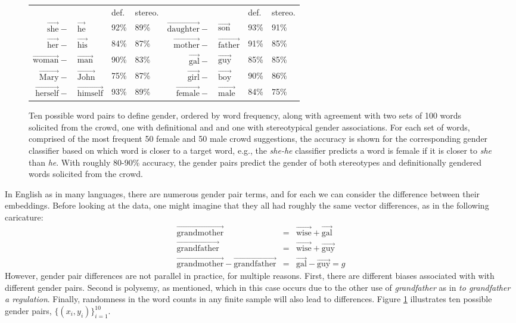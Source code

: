 \documentclass{article}
\newcommand{\wvec}[1]{\overrightarrow{\text{#1}}}
\begin{document}
\begin{figure}
\begin{tabular}{r@{\hskip -0.0in}lllr@{\hskip -0.0in}lll}
& & def. & stereo. & & & def. & stereo. \\
$\wvec{she}-$&$\wvec{he}$ & 92\% & 89\% & $\wvec{daughter}-$&$\wvec{son}$ & 93\% & 91\% \\
$\wvec{her}-$&$\wvec{his}$ & 84\% & 87\% & $\wvec{mother}-$&$\wvec{father}$ & 91\% & 85\% \\
$\wvec{woman}-$&$\wvec{man}$ & 90\% & 83\% & $\wvec{gal}-$&$\wvec{guy}$ & 85\% & 85\% \\
$\wvec{Mary}-$&$\wvec{John}$ & 75\% & 87\% & $\wvec{girl}-$&$\wvec{boy}$ & 90\% & 86\% \\
$\wvec{herself}-$&$\wvec{himself}$ & 93\% & 89\% & $\wvec{female}-$&$\wvec{male}$ & 84\% & 75\%  
\end{tabular}
\caption{\label{fig:definitional_pairs} 
Ten possible word pairs to define gender, ordered by word frequency, along with agreement with two sets of 100 words solicited from the crowd, one with definitional and and one with stereotypical gender associations. For each set of words, comprised of the most frequent 50 female and 50 male crowd suggestions, the accuracy is shown for the corresponding gender classifier based on which word is closer to a target word, e.g., the {\em she-he} classifier predicts a word is female if it is closer to {\em she} than {\em he}. With roughly 80-90\% accuracy, the gender pairs predict the gender of both stereotypes and definitionally gendered words solicited from the crowd. }
\end{figure}

In English as in many languages, there are numerous gender pair terms, and for each we can consider the difference between their embeddings. Before looking at the data, one might imagine that they all had roughly the same vector differences, as in the following caricature: 
\begin{eqnarray*}
\wvec{grandmother} &=& \wvec{wise} + \wvec{gal}\\
\wvec{grandfather} &=& \wvec{wise} + \wvec{guy}\\
\wvec{grandmother} - \wvec{grandfather} &=& \wvec{gal}  - \wvec{guy} = g
\end{eqnarray*}
However, gender pair differences are not parallel in practice, for multiple reasons. First, there are different biases associated with with different gender pairs. Second is polysemy, as mentioned, which in this case occurs due to the other use of {\em grandfather} as in {\em to grandfather a regulation}. Finally, randomness in the word counts in any finite sample will also lead to differences.  Figure \ref{fig:definitional_pairs} illustrates ten possible gender pairs, $\bigl\{(x_i,y_i)\bigr\}_{i=1}^{10}$.
\end{document}
